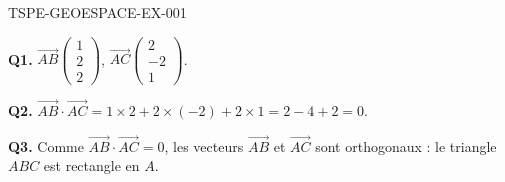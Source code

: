 \begin{corrige}{TSPE-GEOESPACE-EX-001}

\textbf{Q1.} $\vec{AB}\begin{pmatrix}1\\2\\2\end{pmatrix}$, $\vec{AC}\begin{pmatrix}2\\-2\\1\end{pmatrix}$.

\textbf{Q2.} $\vec{AB}\cdot\vec{AC} = 1\times2+2\times(-2)+2\times1 = 2-4+2 = 0$.

\textbf{Q3.} Comme $\vec{AB}\cdot\vec{AC}=0$, les vecteurs $\vec{AB}$ et $\vec{AC}$ sont orthogonaux : le triangle $ABC$ est rectangle en $A$.

\end{corrige}
